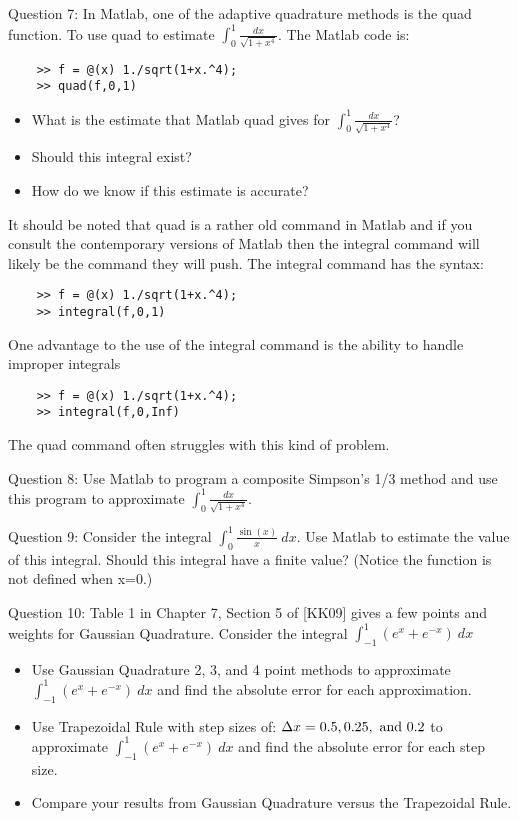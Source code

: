 \documentclass{article}
\renewcommand{\cite}[1]{[#1]}
\def\ds{\displaystyle}
\begin{document}
\medskip \par \noindent
Question 7: In Matlab, one of the adaptive quadrature methods is the quad function. To use quad to estimate $\ds \int_0^1 \frac {dx}{\sqrt{1+x^4}}$. The Matlab code is:
\begin{verbatim}
    >> f = @(x) 1./sqrt(1+x.^4);
    >> quad(f,0,1)
\end{verbatim}
\begin{itemize}
    \item What is the estimate that Matlab quad gives for $\ds \int_0^1 \frac {dx}{\sqrt{1+x^4}}$?
    \item Should this integral exist?
    \item How do we know if this estimate is accurate? 
\end{itemize}
It should be noted that quad is a rather old command in Matlab and if you consult the contemporary versions of Matlab then the integral command will likely be the command they will push. The integral command has the syntax:
\begin{verbatim}
    >> f = @(x) 1./sqrt(1+x.^4);
    >> integral(f,0,1)
\end{verbatim}
One advantage to the use of the integral command is the ability to handle improper integrals
\begin{verbatim}
    >> f = @(x) 1./sqrt(1+x.^4);
    >> integral(f,0,Inf)
\end{verbatim}
The quad command often struggles with this kind of problem. 
\medskip \par \noindent
Question 8: Use Matlab to program a composite Simpson's 1/3 method and use this program to approximate $\ds \int_0^1 \frac {dx}{\sqrt{1+x^4}}$.
\medskip \par \noindent
Question 9: Consider the integral $\ds \int_0^1 \frac {\sin (x)}x \ dx$. Use Matlab to estimate the value of this integral. Should this integral have a finite value?  (Notice the function is not defined when x=0.) \medskip \par \noindent
%
Question 10: Table 1 in Chapter 7, Section 5 of \cite{KK09} gives a few points and weights for Gaussian Quadrature. Consider the integral $\ds \int_{-1}^1 (e^x + e^{-x}) \ dx$ 
\begin{itemize}
    \item Use Gaussian Quadrature 2, 3, and 4 point methods to approximate $\ds \int_{-1}^1 (e^x + e^{-x}) \ dx$ and find the absolute error for each approximation. 
    \item Use Trapezoidal Rule with step sizes of: $\ds \Delta x = 0.5, 0.25, \ {\rm and} \ 0.2$ to approximate $\ds \int_{-1}^1 (e^x + e^{-x}) \ dx$ and find the absolute error for each step size.
    \item Compare your results from Gaussian Quadrature versus the Trapezoidal Rule. 
\end{itemize}
\end{document}
